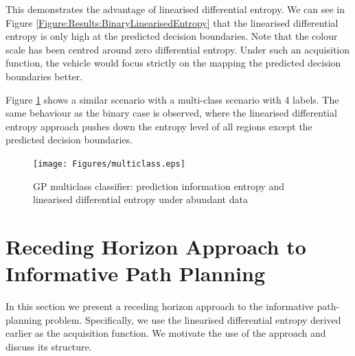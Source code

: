 \documentclass{article}
\begin{document}
		This demonstrates the advantage of linearised differential entropy. We can see in Figure \ref{Figure:Results:BinaryLinearisedEntropy} that the linearised differential entropy is only high at the predicted decision boundaries. Note that the colour scale has been centred around zero differential entropy. Under such an acquisition function, the vehicle would focus strictly on the mapping the predicted decision boundaries better.
		
		Figure \ref{Figure:Results:MulticlassLinearisedEntropy} shows a similar scenario with a multi-class scenario with 4 labels. The same behaviour as the binary case is observed, where the linearised differential entropy approach pushes down the entropy level of all regions except the predicted decision boundaries.
	
		\begin{figure}[t]
		\centering
			\texttt{[image: Figures/multiclass.eps]}
		\caption{GP multiclass classifier: prediction information entropy and linearised differential entropy under abundant data}
		\label{Figure:Results:MulticlassLinearisedEntropy}
		\end{figure}
			
		
\section{Receding Horizon Approach to Informative Path Planning}
\label{Section:RecedingHorizonFormulation}

	In this section we present a receding horizon approach to the informative path-planning problem. Specifically, we use the linearised differential entropy derived earlier as the acquisition function. We motivate the use of the approach and discuss its structure.
	
\end{document}
